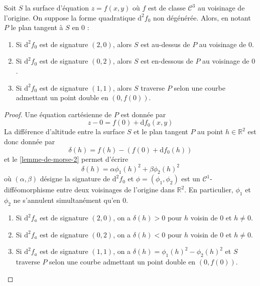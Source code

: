 
	\begin{application}
		Soit $S$ la surface d'équation $z = f(x, y)$ où $f$ est de classe $\mathcal{C}^3$ au voisinage de l'origine. On suppose la forme quadratique $\mathrm{d}^2 f_0$ non dégénérée. Alors, en notant $P$ le plan tangent à $S$ en $0$ :
		\begin{enumerate}[label=(\roman*)]
			\item Si $\mathrm{d}^2 f_0$ est de signature $(2, 0)$, alors $S$ est au-dessus de $P$ au voisinage de $0$.
			\item Si $\mathrm{d}^2 f_0$ est de signature $(0, 2)$, alors $S$ est en-dessous de $P$ au voisinage de $0$.
			\item Si $\mathrm{d}^2 f_0$ est de signature $(1, 1)$, alors $S$ traverse $P$ selon une courbe admettant un point double en $(0, f(0))$.
		\end{enumerate}
	\end{application}

	\begin{proof}
		Une équation cartésienne de $P$ est donnée par
		\[ z - 0 = f(0) + \mathrm{d} f_0(x, y) \]
		La différence d'altitude entre la surface $S$ et le plan tangent $P$ au point $h \in \mathbb{R}^2$ est donc donnée par
		\[ \delta(h) = f(h) - (f(0) + \mathrm{d}f_0(h)) \]
		et le \cref{lemme-de-morse-2} permet d'écrire
		\[ \delta(h) = \alpha \phi_1(h)^2 + \beta \phi_2(h)^2 \]
		où $(\alpha, \beta)$ désigne la signature de $\mathrm{d}^2 f_0$ et $\phi = (\phi_1, \phi_2)$ est un $\mathcal{C}^1$-difféomorphisme entre deux voisinages de l'origine dans $\mathbb{R}^2$. En particulier, $\phi_1$ et $\phi_2$ ne s'annulent simultanément qu'en $0$.
		\begin{enumerate}[label=(\roman*)]
			\item Si $\mathrm{d}^2 f_a$ est de signature $(2, 0)$, on a $\delta(h) > 0$ pour $h$ voisin de $0$ et $h \neq 0$.
			\item Si $\mathrm{d}^2 f_a$ est de signature $(0, 2)$, on a $\delta(h) < 0$ pour $h$ voisin de $0$ et $h \neq 0$.
			\item Si $\mathrm{d}^2 f_a$ est de signature $(1, 1)$, on a $\delta(h) = \phi_1(h)^2 - \phi_2(h)^2$ et $S$ traverse $P$ selon une courbe admettant un point double en $(0, f(0))$.
		\end{enumerate}
	\end{proof}

